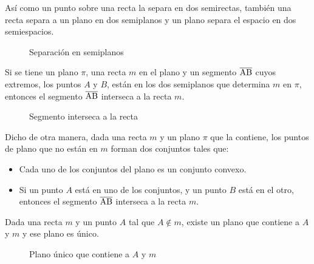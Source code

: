 \clearpage

\begin{postulate}
    Así como un punto sobre una recta la separa en dos semirectas, también una recta separa a un plano en dos semiplanos y un plano separa el espacio en dos semiespacios.
    
    \begin{figure}[!h]
        \centering
        
        \caption{Separación en semiplanos}
        \label{fig:plot16}
    \end{figure}
\end{postulate}

\begin{postulate}
    Si se tiene un plano $\pi$, una recta $m$ en el plano y un segmento $\overline{\rm AB}$ cuyos extremos, los puntos $A$ y $B$, están en los dos semiplanos que determina $m$ en $\pi$, entonces el segmento $\overline{\rm AB}$ interseca a la recta $m$.
    
    \begin{figure}[!h]
        \centering
        
        \caption{Segmento interseca a la recta}
        \label{fig:plot17}
    \end{figure}

    Dicho de otra manera, dada una recta $m$ y un plano $\pi$ que la contiene, los puntos de plano que no están en $m$ forman dos conjuntos tales que:

    \begin{itemize}
        \item Cada uno de los conjuntos del plano es un conjunto convexo.
        \item Si un punto $A$ está en uno de los conjuntos, y un punto $B$ está en el otro, entonces el segmento $\overline{\rm AB}$ interseca a la recta $m$.
    \end{itemize}
    
\end{postulate}

\begin{theorem}
    Dada una recta $m$ y un punto $A$ tal que $A \not \in m$, existe un plano que contiene a $A$ y $m$ y ese plano es único.
 
    \begin{figure}[!h]
        \centering
        
        \caption{Plano único que contiene a $A$ y $m$}
        \label{fig:plot23}
    \end{figure}
        
\end{theorem}


